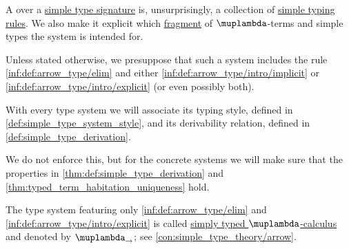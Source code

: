 \begin{definition}\label{def:simple_type_system}\mimprovised
  A  over a \hyperref[def:simple_type_signature]{simple type signature} is, unsurprisingly, a collection of \hyperref[def:simple_typing_rule]{simple typing rules}. We also make it explicit which \hyperref[con:syntax_fragment]{fragment} of \( \muplambda \)-terms and simple types the system is intended for.

  Unless stated otherwise, we presuppose that such a system includes the rule \ref{inf:def:arrow_type/elim} and either \ref{inf:def:arrow_type/intro/implicit} or \ref{inf:def:arrow_type/intro/explicit} (or even possibly both).
\end{definition}
\begin{comments}
  \item With every type system we will associate its typing style, defined in \cref{def:simple_type_system_style}, and its derivability relation, defined in \cref{def:simple_type_derivation}.

  \item We do not enforce this, but for the concrete systems we will make sure that the properties in \cref{thm:def:simple_type_derivation} and \cref{thm:typed_term_habitation_uniqueness} hold.

  \item The type system featuring only \ref{inf:def:arrow_type/elim} and \ref{inf:def:arrow_type/intro/explicit} is called \hyperref[con:simple_type_theory/arrow]{simply typed \( \muplambda \)-calculus} and denoted by \( \muplambda_{\rightarrow} \); see \cref{con:simple_type_theory/arrow}.
\end{comments}

